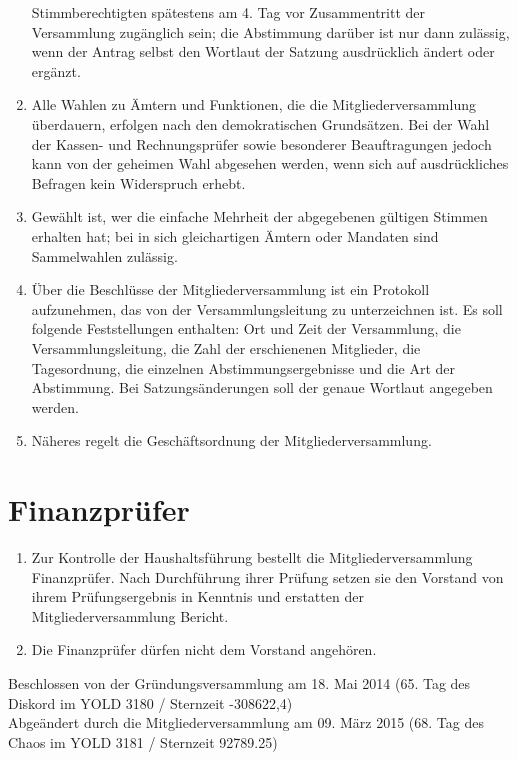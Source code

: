 \begin{enumerate}
		Stimmberechtigten spätestens am 4. Tag vor Zusammentritt der Versammlung zugänglich sein; die Abstimmung darüber ist nur dann zulässig, wenn der Antrag selbst den Wortlaut der Satzung ausdrücklich ändert oder ergänzt.
	\item Alle Wahlen zu Ämtern und Funktionen, die die Mitgliederversammlung überdauern, erfolgen nach den demokratischen Grundsätzen. Bei der Wahl der Kassen- und Rechnungsprüfer sowie besonderer Beauftragungen jedoch kann von der geheimen Wahl abgesehen werden, wenn sich auf ausdrückliches Befragen kein Widerspruch erhebt.
	\item Gewählt ist, wer die einfache Mehrheit der abgegebenen gültigen Stimmen erhalten hat; bei in sich gleichartigen Ämtern oder Mandaten sind Sammelwahlen zulässig.
	\item Über die Beschlüsse der Mitgliederversammlung ist ein Protokoll aufzunehmen, das von der Versammlungsleitung zu unterzeichnen ist. Es soll folgende Feststellungen enthalten: Ort und Zeit der Versammlung, die Versammlungsleitung, die Zahl der erschienenen Mitglieder, die Tagesordnung, die einzelnen Abstimmungsergebnisse und die Art der Abstimmung. Bei Satzungsänderungen soll der genaue Wortlaut angegeben werden.
	\item Näheres regelt die Geschäftsordnung der Mitgliederversammlung.

\end{enumerate}

\chapter{Finanzprüfer}

\begin{enumerate}
	\item Zur Kontrolle der Haushaltsführung bestellt die Mitgliederversammlung Finanzprüfer. Nach Durchführung ihrer Prüfung setzen sie den Vorstand von ihrem Prüfungsergebnis in Kenntnis und erstatten der Mitgliederversammlung Bericht.
	\item Die Finanzprüfer dürfen nicht dem Vorstand angehören.
\end{enumerate}

\vfill

Beschlossen von der Gründungsversammlung am 18. Mai 2014 (65. Tag des Diskord im YOLD 3180 / Sternzeit -308622,4)\\
Abgeändert durch die Mitgliederversammlung am 09. März 2015 (68. Tag des Chaos im YOLD 3181 / Sternzeit 92789.25)\\
